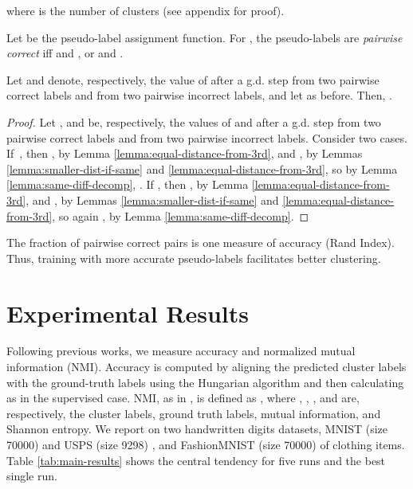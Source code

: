 \documentclass[runningheads]{llncs}
\begin{document}
where  is the number of clusters (see appendix for proof).

\begin{definition}{\rm 
    Let  be the pseudo-label assignment function. For  , the pseudo-labels are \emph{pairwise correct} iff  and , or  and .}
\end{definition}



\begin{theorem}
    Let  and  denote, respectively, the value of  after a g.d. step from two pairwise correct labels and from two pairwise incorrect labels, and let  as before. Then, .
\end{theorem}
\begin{proof}
Let , and  be, respectively, the values of  and  after a g.d. step from two pairwise correct labels and from two pairwise incorrect labels.
Consider two cases. If~, then , by Lemma \ref{lemma:equal-distance-from-3rd}, and , by Lemmas \ref{lemma:smaller-dist-if-same} and \ref{lemma:equal-distance-from-3rd}, so by Lemma \ref{lemma:same-diff-decomp}, . If , then , by Lemma \ref{lemma:equal-distance-from-3rd}, and , by Lemmas \ref{lemma:smaller-dist-if-same} and \ref{lemma:equal-distance-from-3rd}, so again , by Lemma \ref{lemma:same-diff-decomp}.
\end{proof}
The fraction of pairwise correct pairs is one measure of accuracy (Rand Index). Thus, training with more accurate pseudo-labels facilitates better clustering. 

  
  \section{Experimental Results} \label{sec:results}
\noindent Following previous works, we measure accuracy and normalized mutual information (NMI). Accuracy is computed by aligning the predicted cluster labels with the ground-truth labels using the Hungarian algorithm \cite{kuhn1955hungarian} and then calculating as in the supervised case. NMI, as in \cite{witten2002data}, is defined as 
, 
where , , , and  are, respectively, the cluster labels, ground truth labels, mutual information, and Shannon entropy. We report on two handwritten digits datasets, MNIST (size 70000) \cite{lecun1998gradient} and USPS (size 9298) \cite{hull1994database}, and FashionMNIST (size 70000) \cite{xiao2017fashion} of clothing items. Table \ref{tab:main-results} shows the central tendency for five runs and the best single run.
\end{document}
